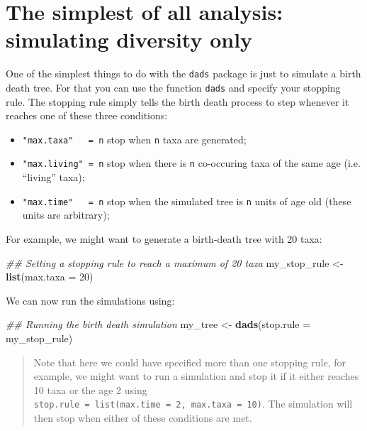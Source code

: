 \documentclass[]{book}
\newenvironment{Shaded}{\begin{snugshade}}{\end{snugshade}}
\newcommand{\CommentTok}[1]{\textcolor[rgb]{0.56,0.35,0.01}{\textit{#1}}}
\newcommand{\DataTypeTok}[1]{\textcolor[rgb]{0.13,0.29,0.53}{#1}}
\newcommand{\DecValTok}[1]{\textcolor[rgb]{0.00,0.00,0.81}{#1}}
\newcommand{\KeywordTok}[1]{\textcolor[rgb]{0.13,0.29,0.53}{\textbf{#1}}}
\newcommand{\NormalTok}[1]{#1}
\newcommand{\StringTok}[1]{\textcolor[rgb]{0.31,0.60,0.02}{#1}}
\providecommand{\tightlist}{%
  \setlength{\itemsep}{0pt}\setlength{\parskip}{0pt}}
\begin{document}
\hypertarget{the-simplest-of-all-analysis-simulating-diversity-only}{%
\section{The simplest of all analysis: simulating diversity only}\label{the-simplest-of-all-analysis-simulating-diversity-only}}

One of the simplest things to do with the \texttt{dads} package is just to simulate a birth death tree.
For that you can use the function \texttt{dads} and specify your stopping rule.
The stopping rule simply tells the birth death process to step whenever it reaches one of these three conditions:

\begin{itemize}
\tightlist
\item
  \texttt{"max.taxa"\ \ \ =\ n} stop when \texttt{n} taxa are generated;
\item
  \texttt{"max.living"\ =\ n} stop when there is \texttt{n} co-occuring taxa of the same age (i.e. ``living'' taxa);
\item
  \texttt{"max.time"\ \ \ =\ n} stop when the simulated tree is \texttt{n} units of age old (these units are arbitrary);
\end{itemize}

For example, we might want to generate a birth-death tree with 20 taxa:

\begin{Shaded}
\begin{Highlighting}[]
\CommentTok{## Setting a stopping rule to reach a maximum of 20 taxa}
\NormalTok{my_stop_rule <-}\StringTok{ }\KeywordTok{list}\NormalTok{(}\DataTypeTok{max.taxa =} \DecValTok{20}\NormalTok{)}
\end{Highlighting}
\end{Shaded}

We can now run the simulations using:

\begin{Shaded}
\begin{Highlighting}[]
\CommentTok{## Running the birth death simulation}
\NormalTok{my_tree <-}\StringTok{ }\KeywordTok{dads}\NormalTok{(}\DataTypeTok{stop.rule =}\NormalTok{ my_stop_rule)}
\end{Highlighting}
\end{Shaded}

\begin{quote}
Note that here we could have specified more than one stopping rule, for example, we might want to run a simulation and stop it if it either reaches 10 taxa or the age 2 using \texttt{stop.rule\ =\ list(max.time\ =\ 2,\ max.taxa\ =\ 10)}. The simulation will then stop when either of these conditions are met.
\end{quote}
\end{document}
